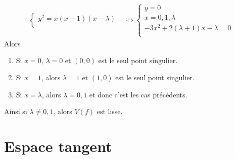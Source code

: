 \begin{expl}
\begin{enumerate}
\begin{align*}
\begin{cases}
                    y^2 = x(x-1)(x - \lambda) \\
                    \end{cases}
                    &\iff 
                    \begin{cases}
                        y = 0 \\
                        x = 0,1,\lambda \\
                        -3x^2 + 2(\lambda + 1)x - \lambda = 0 \\
                    \end{cases}
                \end{align*}
                Alors
                \begin{enumerate}
                    \item Si $x = 0$, $\lambda = 0$ et $(0,0)$ est le seul point singulier.
                    \item Si $x = 1$, alors $\lambda = 1$ et $(1,0)$ est le seul point singulier.
                    \item Si $x = \lambda$, alors $\lambda = 0,1$ et donc c'est les cas précédents.
                \end{enumerate}
                Ainsi si $\lambda \neq 0,1$, alors $V(f)$ est lisse.
            \end{enumerate}
        \end{expl}

    \section{Espace tangent}
